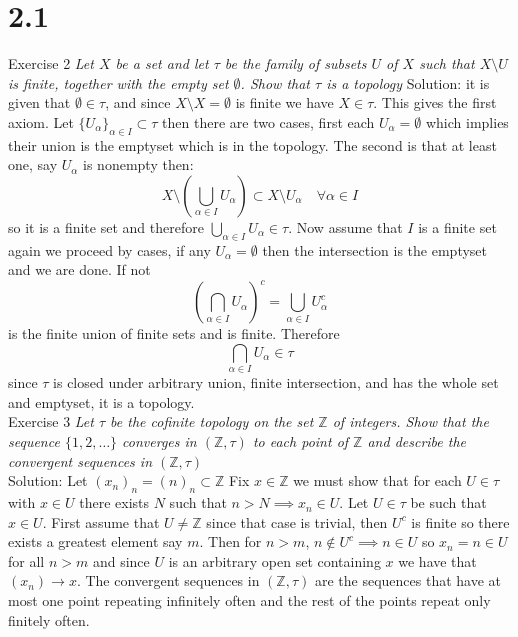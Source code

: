 \documentclass[11pt]{article}
\newcommand{\solution}[1]{{{\textcolor{header}{Solution:} \textcolor{solution}{#1}}}}
\begin{document}
\section{2.1}
Exercise 2
\emph{
    Let $X$ be a set and let  $ \tau$ be the family of subsets  $U$ of  $X$ such that  $ X \setminus U$ is finite, together with the empty
    set  $\emptyset$. Show that  $\tau$ is a topology
}
\solution{
    it is given that $\emptyset \in \tau$, and since $X \setminus X = \emptyset$ is finite we have  $X \in \tau$. This 
    gives the first axiom. Let  $\{U_\alpha\}_{\alpha \in I} \subset \tau$ then there are two cases, first each $U_\alpha = \emptyset$ which implies their union is the emptyset which is in the topology.
    The second is that at least one, say $U_\alpha$ is nonempty then:
    \[
        X \setminus (\bigcup_{\alpha \in I} U_\alpha) \subset X \setminus U_\alpha \quad \forall \alpha \in I
    \] 
    so it is a finite set and therefore $\bigcup_{\alpha \in I} U_\alpha \in \tau$.
    Now assume that $I$ is a finite set again we proceed by cases, if any $U_\alpha = \emptyset$ then the intersection is the emptyset and we are done. If not
     \[
         (\bigcap_{\alpha \in I}U_\alpha)^{c} = \bigcup_{\alpha \in I}U_\alpha^{c}
    \] 
    is the finite union of finite sets and is finite. Therefore
    \[
        \bigcap_{\alpha \in I}U_\alpha \in \tau
    \] 
    since $\tau$ is closed under arbitrary union, finite intersection, and has the whole set and emptyset, it is a topology.
}\\
Exercise 3
\emph{
    Let $\tau$ be the cofinite topology on the set  $ \mathbb{Z}$ of integers. Show that
    the sequence $\{1,2,\dots\}$ converges in  $( \mathbb{Z}, \tau)$ to each point of $ \mathbb{Z}$ and describe the convergent sequences in $ ( \mathbb{Z}, \tau)$
}\\ 
\solution{
    Let $(x_n)_n = (n)_n \subset \mathbb{Z}$
    Fix $x \in \mathbb{Z}$ we must show that for each $U \in \tau$ with  $x \in U$ there exists  $N$ such that $n > N \implies x_n \in U$.
    Let  $U \in \tau$ be such that  $x \in U$. First assume that $U \ne \mathbb{Z}$ since that case is trivial,  then  $U^{c}$ is finite so there exists a greatest element say $m$.
    Then for  $n > m$,  $n \not\in U^{c} \implies n \in U$ so $x_n = n \in U$ for all  $n > m$ and since  $U$ is an arbitrary open set containing  $x$
    we have that  $(x_n) \to x$. The convergent sequences in $( \mathbb{Z}, \tau)$ are the sequences that have at most one point repeating infinitely often and the rest of the points repeat only finitely often.
}\\
\end{document}
